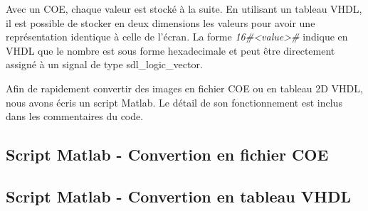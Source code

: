 \documentclass[french]{nakrule}
\begin{document}
Avec un COE, chaque valeur est stocké à la suite. En utilisant un tableau VHDL,
il est possible de stocker en deux dimensions les valeurs pour avoir une
représentation identique à celle de l'écran. La forme \emph{16\#<value>\#} indique
en VHDL que le nombre est sous forme hexadecimale et peut être directement
assigné à un signal de type sdl\_logic\_vector.

Afin de rapidement convertir des images en fichier COE ou en tableau 2D VHDL,
nous avons écris un script Matlab. Le détail de son fonctionnement est inclus
dans les commentaires du code.


\clearpage

\subsection{Script Matlab - Convertion en fichier COE}
\label{subsec:Script1}
\vspace{.1in}

\clearpage

\subsection{Script Matlab - Convertion en tableau VHDL}
\label{subsec:Script2}
\vspace{.1in}

\end{document}
